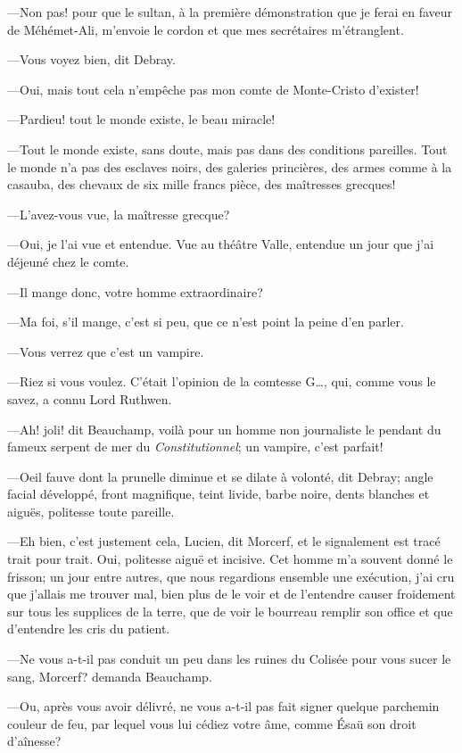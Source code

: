 —Non pas! pour que le sultan, à la première démonstration que je ferai en faveur de Méhémet-Ali, m'envoie le cordon et que mes secrétaires m'étranglent. 

—Vous voyez bien, dit Debray. 

—Oui, mais tout cela n'empêche pas mon comte de Monte-Cristo d'exister! 

—Pardieu! tout le monde existe, le beau miracle! 

—Tout le monde existe, sans doute, mais pas dans des conditions pareilles. Tout le monde n'a pas des esclaves noirs, des galeries princières, des armes comme à la casauba, des chevaux de six mille francs pièce, des maîtresses grecques!  

—L'avez-vous vue, la maîtresse grecque? 

—Oui, je l'ai vue et entendue. Vue au théâtre Valle, entendue un jour que j'ai déjeuné chez le comte. 

—Il mange donc, votre homme extraordinaire? 

—Ma foi, s'il mange, c'est si peu, que ce n'est point la peine d'en parler. 

—Vous verrez que c'est un vampire. 

—Riez si vous voulez. C'était l'opinion de la comtesse G\dots, qui, comme vous le savez, a connu Lord Ruthwen. 

—Ah! joli! dit Beauchamp, voilà pour un homme non journaliste le pendant du fameux serpent de mer du \textit{Constitutionnel}; un vampire, c'est parfait! 

—Oeil fauve dont la prunelle diminue et se dilate à volonté, dit Debray; angle facial développé, front magnifique, teint livide, barbe noire, dents blanches et aiguës, politesse toute pareille. 

—Eh bien, c'est justement cela, Lucien, dit Morcerf, et le signalement est tracé trait pour trait. Oui, politesse aiguë et incisive. Cet homme m'a souvent donné le frisson; un jour entre autres, que nous regardions ensemble une exécution, j'ai cru que j'allais me trouver mal, bien plus de le voir et de l'entendre causer froidement sur tous les supplices de la terre, que de voir le bourreau remplir son office et que d'entendre les cris du patient. 

—Ne vous a-t-il pas conduit un peu dans les ruines du Colisée pour vous sucer le sang, Morcerf? demanda Beauchamp. 

—Ou, après vous avoir délivré, ne vous a-t-il pas fait signer quelque parchemin couleur de feu, par lequel vous lui cédiez votre âme, comme Ésaü son droit d'aînesse? 

